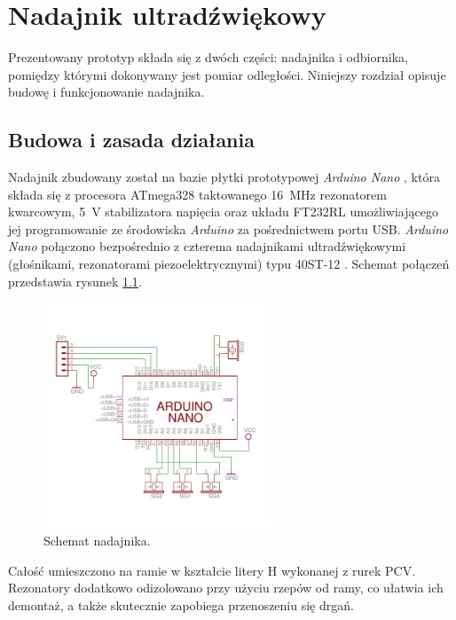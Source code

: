 \chapter{Nadajnik ultradźwiękowy}

Prezentowany prototyp składa się z dwóch części: nadajnika i odbiornika, pomiędzy którymi
dokonywany jest pomiar odległości. Niniejszy rozdział opisuje budowę i funkcjonowanie nadajnika. 

\section{Budowa i zasada działania}

Nadajnik zbudowany został na bazie płytki prototypowej \textit{Arduino Nano} \cite{bib:arduinoNano},
która składa się z procesora ATmega328 \cite{bib:atmega328} taktowanego \SI{16}{MHz} rezonatorem kwarcowym,
\SI{5}{V} stabilizatora napięcia oraz układu FT232RL umożliwiającego 
jej programowanie  ze środowiska \textit{Arduino} \cite{bib:Arduino} za pośrednictwem portu USB. 
\textit{Arduino Nano} połączono 
bezpośrednio z czterema nadajnikami ultradźwiękowymi (głośnikami, rezonatorami piezoelektrycznymi) typu 40ST-12 \cite{bib:40ST12}.
Schemat połączeń przedstawia rysunek \ref{fig:nadajnik_schemat}.

 \begin{figure}[ht!]
    \centering
    \includegraphics[width=0.6\textwidth, trim= 0mm 0mm 0mm 0mm,clip]{transmitter}
    \caption{Schemat nadajnika.}
    \label{fig:nadajnik_schemat}
\end{figure}

Całość umieszczono na ramie w kształcie litery H wykonanej z rurek PCV.
Rezonatory dodatkowo odizolowano przy użyciu rzepów od ramy, co ułatwia ich demontaż, a także skutecznie
zapobiega przenoszeniu się drgań. 

